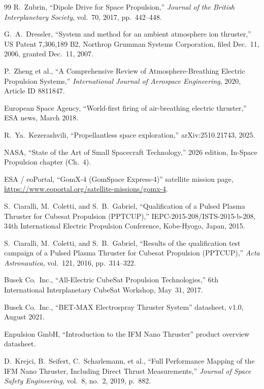 \documentclass[11pt]{article}
\begin{document}
\begin{thebibliography}{99}
 R.~Zubrin, ``Dipole Drive for Space Propulsion,'' \emph{Journal
  of the British Interplanetary Society}, vol.~70, 2017, pp.~442--448.

 G.~A.~Dressler, ``System and method for an ambient atmosphere
  ion thruster,'' US Patent 7,306,189 B2, Northrop Grumman Systems
  Corporation, filed Dec.~11, 2006, granted Dec.~11, 2007.

 P.~Zheng et al., ``A Comprehensive Review of
  Atmosphere-Breathing Electric Propulsion Systems,'' \emph{International
  Journal of Aerospace Engineering}, 2020, Article ID 8811847.

 European Space Agency, ``World-first firing of
  air-breathing electric thruster,'' ESA news, March 2018.

 R.~Ya.~Kezerashvili, ``Propellantless space exploration,''
  arXiv:2510.21743, 2025.

 NASA, ``State of the Art of Small Spacecraft Technology,''
  2026 edition, In-Space Propulsion chapter (Ch.~4).

 ESA / eoPortal, ``GomX-4 (GomSpace Express-4)'' satellite
  mission page, \url{https://www.eoportal.org/satellite-missions/gomx-4}.

 S.~Ciaralli, M.~Coletti, and S.~B.~Gabriel, ``Qualification of
  a Pulsed Plasma Thruster for Cubesat Propulsion (PPTCUP),''
  IEPC-2015-208/ISTS-2015-b-208, 34th International Electric Propulsion
  Conference, Kobe-Hyogo, Japan, 2015.

 S.~Ciaralli, M.~Coletti, and S.~B.~Gabriel, ``Results of the
  qualification test campaign of a Pulsed Plasma Thruster for Cubesat
  Propulsion (PPTCUP),'' \emph{Acta Astronautica}, vol.~121, 2016,
  pp.~314--322.

 Busek Co.\ Inc., ``All-Electric CubeSat Propulsion
  Technologies,'' 6th International Interplanetary CubeSat Workshop, May~31,
  2017.

 Busek Co.\ Inc., ``BET-MAX Electrospray Thruster
  System'' datasheet, v1.0, August 2021.

 Enpulsion GmbH, ``Introduction to the IFM Nano Thruster''
  product overview datasheet.

 D.~Krejci, B.~Seifert, C.~Scharlemann, et al., ``Full
  Performance Mapping of the IFM Nano Thruster, Including Direct Thrust
  Measurements,'' \emph{Journal of Space Safety Engineering}, vol.~8, no.~2,
  2019, p.~882.


\end{thebibliography}
\end{document}
